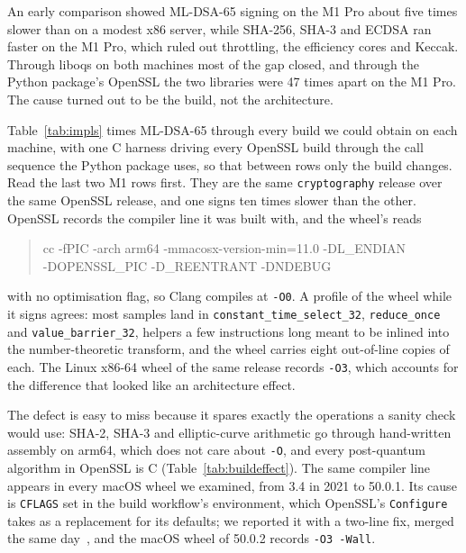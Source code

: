 An early comparison showed ML-DSA-65 signing on the M1 Pro about five times
slower than on a modest x86 server, while SHA-256, SHA-3 and ECDSA ran faster
on the M1 Pro, which ruled out throttling, the efficiency cores and Keccak.
Through liboqs on both machines most of the gap closed, and through the
Python package's OpenSSL the two libraries were 47 times apart on the M1 Pro.
The cause turned out to be the build, not the architecture.




Table~\ref{tab:impls} times ML-DSA-65 through every build we could obtain on
each machine, with one C harness driving every OpenSSL build through the call
sequence the Python package uses, so that between rows only the build
changes. Read the last two M1 rows first. They are the same
\texttt{cryptography} release over the same OpenSSL release, and one signs
ten times slower than the other. OpenSSL records the compiler line it was
built with, and the wheel's reads
\begin{quote}\small\ttfamily
cc -fPIC -arch arm64 -mmacosx-version-min=11.0 -DL\_ENDIAN\\
\quad -DOPENSSL\_PIC -D\_REENTRANT -DNDEBUG
\end{quote}
with no optimisation flag, so Clang compiles at \texttt{-O0}. A profile of the
wheel while it signs agrees: most samples land in
\texttt{constant\_time\_\allowbreak select\_32},
\texttt{reduce\_\allowbreak once} and \texttt{value\_\allowbreak barrier\_32},
helpers a few instructions long meant to be inlined into the number-theoretic
transform, and the wheel carries eight out-of-line copies of each. The Linux
x86-64 wheel of the same release records \texttt{-O3}, which accounts for the
difference that looked like an architecture effect.

The defect is easy to miss because it spares exactly the operations a sanity
check would use: SHA-2, SHA-3 and elliptic-curve arithmetic go through
hand-written assembly on arm64, which does not care about \texttt{-O}, and
every post-quantum algorithm in OpenSSL is C (Table~\ref{tab:buildeffect}). The same compiler line appears in every macOS wheel we
examined, from 3.4 in 2021 to 50.0.1. Its cause is \texttt{CFLAGS} set in the
build workflow's environment, which OpenSSL's \texttt{Configure} takes as a
replacement for its defaults; we reported it with a two-line fix, merged the
same day~\cite{pyca_issue15702,pyca_infra796}, and the macOS wheel of 50.0.2
records \texttt{-O3 -Wall}.

